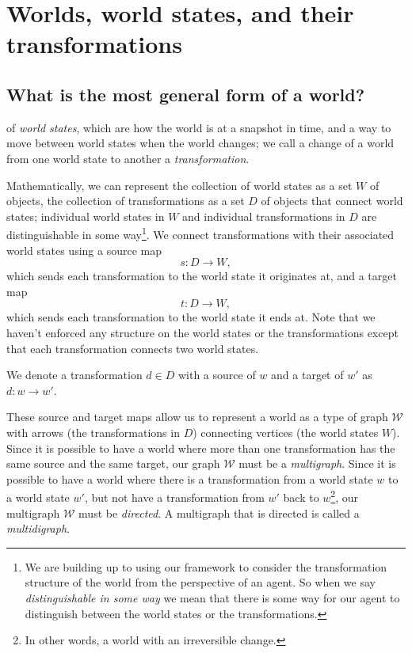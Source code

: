 \section{Worlds, world states, and their transformations}\label{sec:A mathematical treatment of worlds and their transformations}

\subsection{What is the most general form of a world?}
 of \emph{world states}, which are how the world is at a snapshot in time, and a way to move between world states when the world changes; we call a change of a world from one world state to another a \emph{transformation}.

Mathematically, we can represent the collection of world states as a set $W$ of objects, the collection of transformations as a set $D$ of objects that connect world states; individual world states in $W$ and individual transformations in $D$ are distinguishable in some way\footnote{
We are building up to using our framework to consider the transformation structure of the world from the perspective of an agent. So when we say \emph{distinguishable in some way} we mean that there is some way for our agent to distinguish between the world states or the transformations.
}.
We connect transformations with their associated world states using a source map
\begin{equation}
	s: D \to W,
\end{equation}
which sends each transformation to the world state it originates at, and a target map
\begin{equation}
	t: D \to W,
\end{equation}
which sends each transformation to the world state it ends at.
Note that we haven't enforced any structure on the world states or the transformations except that each transformation connects two world states.

\begin{notation}
	We denote a transformation $d \in D$ with a source of $w$ and a target of $w'$ as $d: w \to w'$.
\end{notation}

These source and target maps allow us to represent a world as a type of graph $\mathscr{W}$ with arrows (the transformations in $D$) connecting vertices (the world states $W$).
Since it is possible to have a world where more than one transformation has the same source and the same target, our graph $\mathscr{W}$ must be a \emph{multigraph}.
Since it is possible to have a world where there is a transformation from a world state $w$ to a world state $w'$, but not have a transformation from $w'$ back to $w$\footnote{In other words, a world with an irreversible change.}, our multigraph $\mathscr{W}$ must be \emph{directed}.
A multigraph that is directed is called a \emph{multidigraph}.

